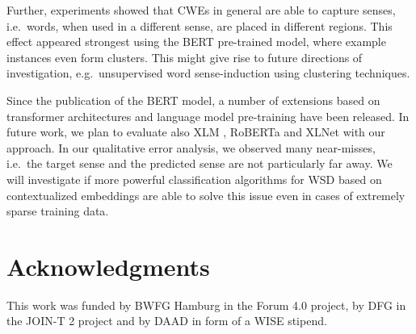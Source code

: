 \documentclass[11pt]{article}
\begin{document}
Further, experiments showed that CWEs in general are able to capture senses, i.e.\ words, when used in a different sense, are placed in different regions.
This effect appeared strongest using the BERT pre-trained model, where example instances even form clusters.
This might give rise to future directions of investigation, e.g.\ unsupervised word sense-induction using clustering techniques.

\noindent
Since the publication of the BERT model, a number of extensions based on transformer architectures and language model pre-training have been released. In future work, we plan to evaluate also XLM \cite{lample:2019}, RoBERTa \cite{Liu.2019} and XLNet \cite{yang.2019} with our approach. 
In our qualitative error analysis, we observed many near-misses, i.e.\ the target sense and the predicted sense are not particularly far away.
We will investigate if more powerful classification algorithms for WSD based on contextualized embeddings are able to solve this issue even in cases of extremely sparse training data.





\section*{Acknowledgments}
This work was funded by BWFG Hamburg in the Forum 4.0 project, by DFG in the JOIN-T 2 project and by DAAD in form of a WISE stipend.  


\end{document}
